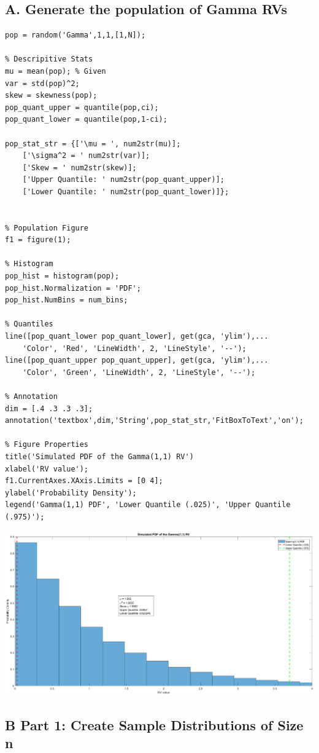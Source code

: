 \documentclass[12pt]{article}
\begin{document}
\subsection*{A. Generate the population of Gamma RVs}

\begin{verbatim}
pop = random('Gamma',1,1,[1,N]);

% Descripitive Stats
mu = mean(pop); % Given
var = std(pop)^2;
skew = skewness(pop);
pop_quant_upper = quantile(pop,ci);
pop_quant_lower = quantile(pop,1-ci);

pop_stat_str = {['\mu = ', num2str(mu)];
    ['\sigma^2 = ' num2str(var)];
    ['Skew = ' num2str(skew)];
    ['Upper Quantile: ' num2str(pop_quant_upper)];
    ['Lower Quantile: ' num2str(pop_quant_lower)]};


% Population Figure
f1 = figure(1);

% Histogram
pop_hist = histogram(pop);
pop_hist.Normalization = 'PDF';
pop_hist.NumBins = num_bins;

% Quantiles
line([pop_quant_lower pop_quant_lower], get(gca, 'ylim'),...
    'Color', 'Red', 'LineWidth', 2, 'LineStyle', '--');
line([pop_quant_upper pop_quant_upper], get(gca, 'ylim'),...
    'Color', 'Green', 'LineWidth', 2, 'LineStyle', '--');

% Annotation
dim = [.4 .3 .3 .3];
annotation('textbox',dim,'String',pop_stat_str,'FitBoxToText','on');

% Figure Properties
title('Simulated PDF of the Gamma(1,1) RV')
xlabel('RV value');
f1.CurrentAxes.XAxis.Limits = [0 4];
ylabel('Probability Density');
legend('Gamma(1,1) PDF', 'Lower Quantile (.025)', 'Upper Quantile (.975)');
\end{verbatim}

\includegraphics [width=\textwidth]{prob4_01.eps}


\subsection*{B Part 1: Create Sample Distributions of Size n}
\end{document}
